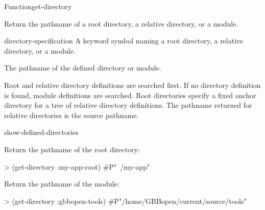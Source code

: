 \documentclass[10pt,twoside,english,pdftex]{article}
\begin{document}

\begin{functiondoc}{Function}{get-directory}{
    \returns{} }
%

\fnsyntax 

\fnpurpose Return the pathname of a root directory, a relative
directory, or a module.

\fnpackage {}

\fnmodule {}

\fnargs
\begin{args}{directory-specification}
\arg[name] A keyword symbol naming a root directory, a relative directory, 
or a module.
\end{args}

\fnreturns The pathname of the defined directory or module.

\fndescription Root and relative directory definitions are searched
first.  If no  directory definition is found, module
definitions are searched.  Root directories specify a fixed anchor
directory for a tree of relative directory definitions.  The pathname
returned for relative directories is the source pathname.

\begin{alsos}{show-defined-directories}
\end{alsos}

\fnexamples

Return the pathname of the  root directory:
\begin{example}
> (get-directory :my-app-root)
#P"~/my-app"
\end{example}

Return the pathname of the  module:
\begin{example}
> (get-directory :gbbopen-tools)
#P"/home/GBBopen/current/source/tools"
\end{example}

\end{functiondoc}

\end{document}

